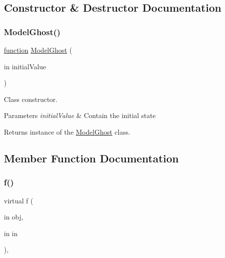 \subsection{Constructor \& Destructor Documentation}
\mbox{\label{class_model_ghost_a0eb9a8f9771bba8a091d35339af59343}} 
\subsubsection{\texorpdfstring{Model\+Ghost()}{ModelGhost()}}
{\footnotesize\ttfamily \hyperlink{_plan__desuma_functions__2_players_8m_ac2ffb26d6f42d3bbcd7847b0873403f4}{function} \hyperlink{class_model_ghost}{Model\+Ghost} (\begin{DoxyParamCaption}\item[{in}]{initial\+Value }\end{DoxyParamCaption})}



Class constructor. 


\begin{DoxyParams}{Parameters}
{\em initial\+Value} & Contain the initial state \\
\hline
\end{DoxyParams}
\begin{DoxyReturn}{Returns}
instance of the \hyperlink{class_model_ghost}{Model\+Ghost} class. 
\end{DoxyReturn}


\subsection{Member Function Documentation}
\mbox{\label{class_model_s_e_d_ac36f9451c43b120828af4380858f2024}} 
\subsubsection{\texorpdfstring{f()}{f()}\hspace{0.1cm}{\footnotesize\ttfamily [1/2]}}
{\footnotesize\ttfamily virtual f (\begin{DoxyParamCaption}\item[{in}]{obj,  }\item[{in}]{in }\end{DoxyParamCaption})\hspace{0.3cm}{\ttfamily [virtual]}, {\ttfamily [inherited]}}



